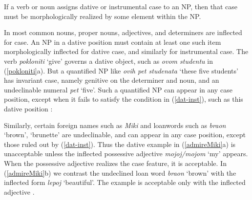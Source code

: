 \ea
{\label{dat-inst}
 \medskip

If a verb or noun assigns dative or instrumental case to an NP, then that case must be morphologically realized by some element within the NP.}
\z

\noindent
In  most common nouns, proper nouns, adjectives, and determiners are inflected for case.  An NP in a dative position must contain at least one such item morphologically inflected for dative case, and similarly for instrumental case.  The verb {\it pokloniti} `give' governs a dative object, such as \textit{ovom  studentu} in (\ref{pokloniti}a).  But a quantified NP like \textit{ovih pet studenata} `these five students' has invariant case, namely genitive on the determiner and noun, and an undeclinable numeral \textit{pet} `five'.  Such a quantified NP can appear in any case position, except when it fails to satisfy the condition in (\ref{dat-inst}), such as this dative position \citep[125]{WZ2003a}:

\begin{exe} 
\ex	\label{pokloniti}
\begin{xlist}
\end{xlist}
\end{exe}

\begin{sloppypar}
\noindent
  Similarly, certain foreign names such as \textit{Miki} and loanwords such as {\it braon} `brown', `brunette' are undeclinable, and can appear in any case position, except those ruled out by (\ref{dat-inst}).  Thus the
dative example in (\ref{admireMiki}a) is unacceptable unless the inflected possessive
adjective {\it mojoj/mojom} `my'  appears.   When the possessive adjective realizes the case
feature, it is acceptable.  In  (\ref{admireMiki}b) we contrast the undeclined loan word {\it
braon} `brown' with the inflected form {\it lepoj} `beautiful'.  The example is acceptable only
with the inflected adjective \citep[134]{WZ2003a}.  
\end{sloppypar}

